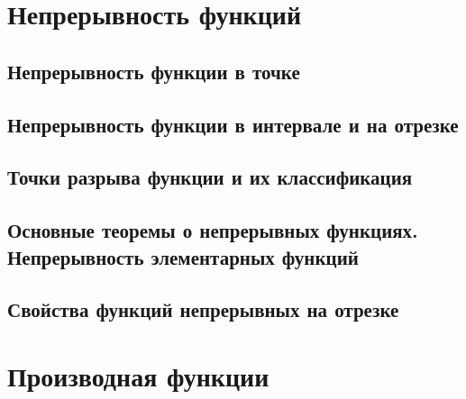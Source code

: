\documentclass[14pt]{extreport}
\begin{document}
\chapter{Непрерывность функций}

\section{Непрерывность функции в точке}

\section{Непрерывность функции в интервале и на отрезке}

\section{Точки разрыва функции и их классификация}

\section{Основные теоремы о непрерывных функциях. Непрерывность элементарных функций}

\section{Свойства функций непрерывных на отрезке}



\chapter{Производная функции}
\end{document}
